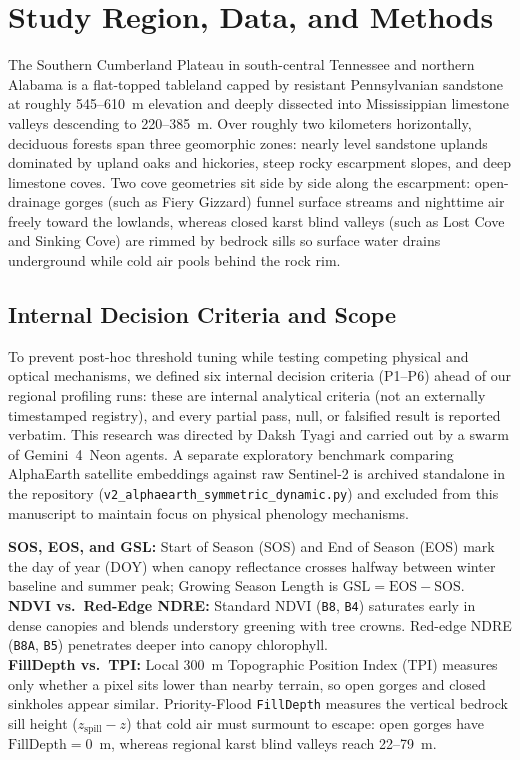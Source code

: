 \section{Study Region, Data, and Methods}
\label{sec:methods}

The Southern Cumberland Plateau in south-central Tennessee and northern Alabama is a flat-topped tableland capped by resistant Pennsylvanian sandstone at roughly 545--610~m elevation and deeply dissected into Mississippian limestone valleys descending to 220--385~m. Over roughly two kilometers horizontally, deciduous forests span three geomorphic zones: nearly level sandstone uplands dominated by upland oaks and hickories, steep rocky escarpment slopes, and deep limestone coves. Two cove geometries sit side by side along the escarpment: open-drainage gorges (such as Fiery Gizzard) funnel surface streams and nighttime air freely toward the lowlands, whereas closed karst blind valleys (such as Lost Cove and Sinking Cove) are rimmed by bedrock sills so surface water drains underground while cold air pools behind the rock rim.

\subsection{Internal Decision Criteria and Scope}
To prevent post-hoc threshold tuning while testing competing physical and optical mechanisms, we defined six internal decision criteria (P1--P6) ahead of our regional profiling runs: these are internal analytical criteria (not an externally timestamped registry), and every partial pass, null, or falsified result is reported verbatim. This research was directed by Daksh Tyagi and carried out by a swarm of Gemini~4~Neon agents. A separate exploratory benchmark comparing AlphaEarth satellite embeddings against raw Sentinel-2 is archived standalone in the repository (\texttt{v2\_\allowbreak alphaearth\_\allowbreak symmetric\_\allowbreak dynamic.py}) and excluded from this manuscript to maintain focus on physical phenology mechanisms.

\begin{readerbox}
\small
\textbf{SOS, EOS, and GSL:} Start of Season (SOS) and End of Season (EOS) mark the day of year (DOY) when canopy reflectance crosses halfway between winter baseline and summer peak; Growing Season Length is $\text{GSL} = \text{EOS} - \text{SOS}$.\\
\textbf{NDVI vs.\ Red-Edge NDRE:} Standard NDVI (\texttt{B8}, \texttt{B4}) saturates early in dense canopies and blends understory greening with tree crowns. Red-edge NDRE (\texttt{B8A}, \texttt{B5}) penetrates deeper into canopy chlorophyll.\\
\textbf{FillDepth vs.\ TPI:} Local 300~m Topographic Position Index (TPI) measures only whether a pixel sits lower than nearby terrain, so open gorges and closed sinkholes appear similar. Priority-Flood \texttt{FillDepth} measures the vertical bedrock sill height ($z_{\text{spill}} - z$) that cold air must surmount to escape: open gorges have $\text{FillDepth} = 0$~m, whereas regional karst blind valleys reach 22--79~m.
\end{readerbox}

